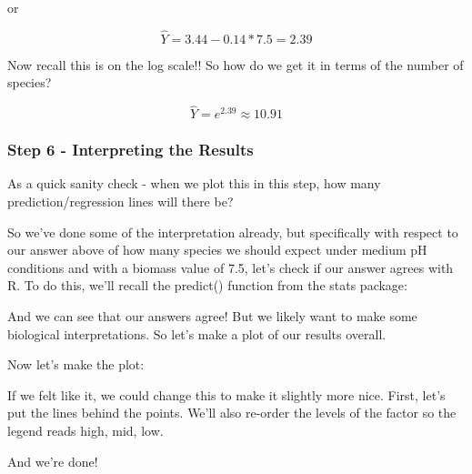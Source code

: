 \documentclass[
]{article}
\begin{document}
or

\[\hat{Y} = 3.44 - 0.14*7.5 = 2.39\]

Now recall this is on the log scale!! So how do we get it in terms of
the number of species?

\[\hat{Y} = e^{2.39} \approx 10.91\]

\hypertarget{step-6---interpreting-the-results}{%
\subsubsection{Step 6 - Interpreting the
Results}\label{step-6---interpreting-the-results}}

As a quick sanity check - when we plot this in this step, how many
prediction/regression lines will there be?

So we've done some of the interpretation already, but specifically with
respect to our answer above of how many species we should expect under
medium pH conditions and with a biomass value of 7.5, let's check if our
answer agrees with R. To do this, we'll recall the predict() function
from the stats package:

And we can see that our answers agree! But we likely want to make some
biological interpretations. So let's make a plot of our results overall.

Now let's make the plot:

If we felt like it, we could change this to make it slightly more nice.
First, let's put the lines behind the points. We'll also re-order the
levels of the factor so the legend reads high, mid, low.

And we're done!
\end{document}
